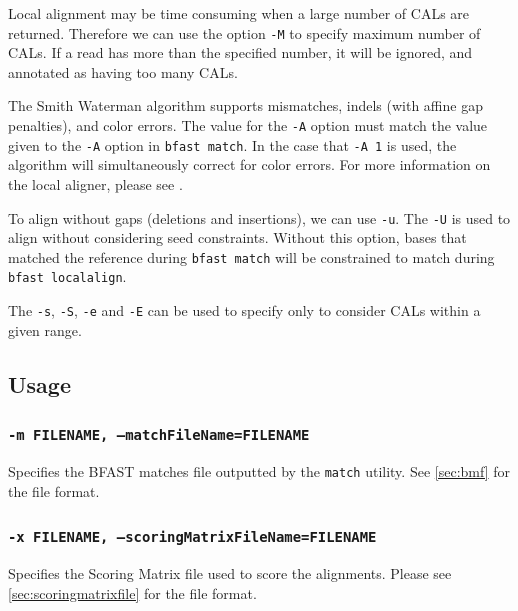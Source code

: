 \documentclass[a4paper,12pt]{book}
\newcommand{\TT}[1]{{\tt #1}} %
\newcommand{\BMF}{BFAST matches file} %
\begin{document}
Local alignment may be time consuming when a large number of CALs are returned.
Therefore we can use the option \TT{-M} to specify maximum number of CALs.
If a read has more than the specified number, it will be ignored, and annotated as having too many CALs.

The Smith Waterman algorithm supports mismatches, indels (with affine gap penalties), and color errors.
The value for the \TT{-A} option must match the value given to the \TT{-A} option in \TT{bfast match}.
In the case that \TT{-A 1} is used, the algorithm will simultaneously correct for color errors.
For more information on the local aligner, please see \cite{BFAST-local-alignment}.

To align without gaps (deletions and insertions), we can use \TT{-u}.
The \TT{-U} is used to align without considering seed constraints.  
Without this option, bases that matched the reference during \TT{bfast match} will be constrained to match during \TT{bfast localalign}.

The \TT{-s}, \TT{-S}, \TT{-e} and \TT{-E} can be used to specify only to consider CALs within a given range.


\subsection{Usage}
\subsubsection{\TT{-m FILENAME, --matchFileName=FILENAME}}
Specifies the \BMF{} outputted by the \TT{match} utility.
See \autoref{sec:bmf} for the file format.

\subsubsection{\TT{-x FILENAME, --scoringMatrixFileName=FILENAME}}
Specifies the Scoring Matrix file used to score the alignments.
Please see \autoref{sec:scoringmatrixfile} for the file format.
\end{document}
